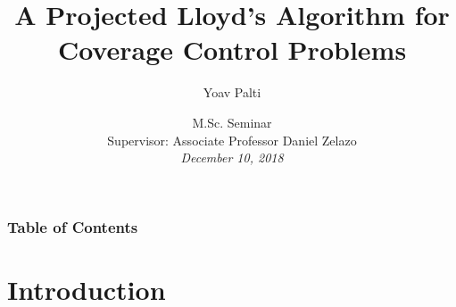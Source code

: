 \documentclass[t]{beamer}
\title{A Projected Lloyd’s Algorithm for Coverage Control Problems}
\author[Palti]
{\Large Yoav Palti}
\institute[]
{Faculty of Aerospace Engineering, Technion - Israel Institute Of Technology}
\date[MSc Seminar]
{\footnotesize M.Sc. Seminar \\
Supervisor: Associate Professor Daniel Zelazo \\[1ex]
\em December 10, 2018}
\begin{document}
\begingroup
\renewcommand*\insertshorttitle{}
\renewcommand*\insertshortauthor{}
\renewcommand*\insertshortinstitute{}
\renewcommand*\dohead{\rule{0em}{1.45em}}
\begin{frame}[label=sl1]
  \titlepage
\end{frame}
\endgroup

\begin{frame}
\frametitle{Table of Contents}
\tableofcontents
\end{frame}


\section[Introduction]{Introduction}

\end{document}
